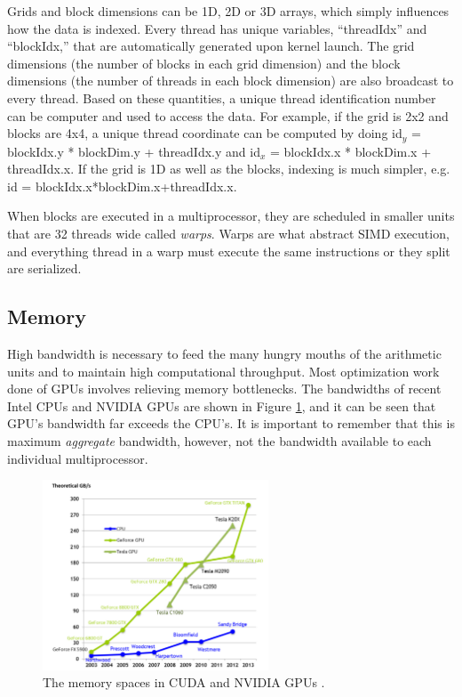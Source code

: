 Grids and block dimensions can be 1D, 2D or 3D arrays, which simply influences how the data is indexed.  Every thread has unique variables, ``threadIdx'' and ``blockIdx,'' that are automatically generated upon kernel launch.  The grid dimensions (the number of blocks in each grid dimension) and the block dimensions (the number of threads in each block dimension) are also broadcast to every thread.  Based on these quantities, a unique thread identification number can be computer and used to access the data.   For example, if the grid is 2x2 and blocks are 4x4, a unique thread coordinate can be computed by doing id$_y$ = blockIdx.y * blockDim.y + threadIdx.y and id$_x$ = blockIdx.x * blockDim.x + threadIdx.x.  If the grid is 1D as well as the blocks, indexing is much simpler, e.g. id = blockIdx.x*blockDim.x+threadIdx.x.

When blocks are executed in a multiprocessor, they are scheduled in smaller units that are 32 threads wide called \emph{warps}.  Warps are what abstract SIMD execution, and everything thread in a warp must execute the same instructions or they split are serialized.

\subsection{Memory}

High bandwidth is necessary to feed the many hungry mouths of the arithmetic units and to maintain high computational throughput.  Most optimization work done of GPUs involves relieving memory bottlenecks.  The bandwidths of recent Intel CPUs and NVIDIA GPUs are shown in Figure \ref{bandwidth}, and it can be seen that GPU's bandwidth far exceeds the CPU's.  It is important to remember that this is maximum \emph{aggregate} bandwidth, however, not the bandwidth available to each individual multiprocessor.   

\begin{figure}[h!] 
  \centering
    \includegraphics[width=0.6\textwidth]{graphics/memory_bandwidth.pdf}
     \caption{The memory spaces in CUDA and NVIDIA GPUs \cite{cuda}. \label{bandwidth}}
\end{figure}

